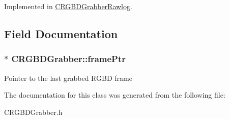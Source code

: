 Implemented in \hyperlink{class_c_r_g_b_d_grabber_rawlog_af499a26d2f6a92184fcc457e9c664da3}{CRGBDGrabberRawlog}.



\subsection{Field Documentation}
\hypertarget{class_c_r_g_b_d_grabber_a672772dade93a640a52e129f14c6d2fa}{
\subsubsection[{framePtr}]{$\ast$ {\bf CRGBDGrabber::framePtr}}}
\label{class_c_r_g_b_d_grabber_a672772dade93a640a52e129f14c6d2fa}
Pointer to the last grabbed RGBD frame 

The documentation for this class was generated from the following file:\begin{DoxyCompactItemize}
\item 
CRGBDGrabber.h\end{DoxyCompactItemize}
